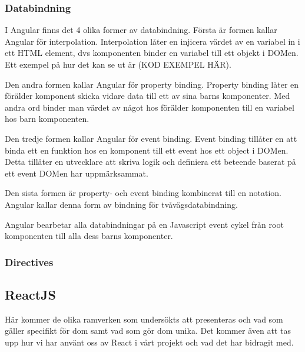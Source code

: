 \subsubsection{Databindning}
I Angular finns det 4 olika former av databindning. Första är formen kallar Angular för interpolation. Interpolation låter en  injicera värdet av en variabel in i ett HTML element, dvs komponenten binder en variabel till ett objekt i DOMen. Ett exempel på hur det kan se ut är (KOD EXEMPEL HÄR).

Den andra formen kallar Angular för property binding. Property binding låter en förälder komponent skicka vidare data till ett av sina barns komponenter. Med andra ord binder man värdet av något hos förälder komponenten till en variabel hos barn komponenten.

Den tredje formen kallar Angular för event binding. Event binding tillåter en att binda ett en funktion hos en komponent till ett event hos ett object i DOMen. Detta tillåter en utvecklare att skriva logik och definiera ett beteende baserat på ett event DOMen har uppmärksammat. 

Den sista formen är property- och event binding kombinerat till en notation. Angular kallar denna form av bindning för tvåvägsdatabindning. 

Angular bearbetar alla databindningar på en Javascript event cykel från root komponenten till alla dess barns komponenter.

\subsubsection{Directives}

\subsection{ReactJS}


Här kommer de olika ramverken som undersökts att presenteras och vad som gäller specifikt för dom samt vad som gör dom unika. Det kommer även att tas upp hur vi har använt oss av React i vårt projekt och vad det har bidragit med. 
